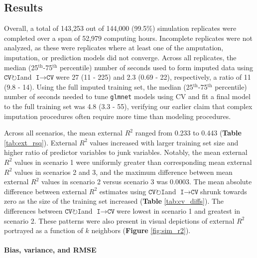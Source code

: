 \documentclass[AMA,STIX1COL,doublespace]{WileyNJD-v2}
\begin{document}
\subsection{Results} \label{subsec:sim_results}

Overall, a total of 143,253 out of 144,000 (99.5\%) simulation
replicates were completed over a span of 52,979 computing hours.
Incomplete replicates were not analyzed, as these were replicates where
at least one of the amputation, imputation, or prediction models did not
converge. Across all replicates, the median
(25\(^{\text{th}}\)-75\(^{\text{th}}\) percentile) number of seconds
used to form imputed data using
$\texttt{CV}\!\circlearrowright\!\texttt{I}$\space and
$\texttt{I}\!\!\rightarrow\!\texttt{CV}$\space were 27 (11 - 225) and
2.3 (0.69 - 22), respectively, a ratio of 11 (9.8 - 14). Using the full
imputed training set, the median (25\(^{\text{th}}\)-75\(^{\text{th}}\)
percentile) number of seconds needed to tune \texttt{glmnet} models
using CV and fit a final model to the full training set was 4.8 (3.3 -
55), verifying our earlier claim that complex imputation procedures
often require more time than modeling procedures.

Across all scenarios, the mean external \(R^2\) ranged from 0.233 to
0.443 (\textbf{Table} \ref{tab:ext_rsq}). External \(R^2\) values
increased with larger training set size and higher ratio of predictor
variables to junk variables. Notably, the mean external \(R^2\) values
in scenario 1 were uniformly greater than corresponding mean external
\(R^2\) values in scenarios 2 and 3, and the maximum difference between
mean external \(R^2\) values in scenario 2 versus scenario 3 was 0.0003.
The mean absolute difference between external \(R^2\) estimates using
$\texttt{CV}\!\circlearrowright\!\texttt{I}$\space and
$\texttt{I}\!\!\rightarrow\!\texttt{CV}$\space shrunk towards zero as
the size of the training set increased (\textbf{Table}
\ref{tab:cv_diffs}). The differences between
$\texttt{CV}\!\circlearrowright\!\texttt{I}$\space and
$\texttt{I}\!\!\rightarrow\!\texttt{CV}$\space were lowest in scenario 1
and greatest in scenario 2. These patterns were also present in visual
depictions of external \(R^2\) portrayed as a function of \(k\)
neighbors (\textbf{Figure} \ref{fig:sim_r2}).

\paragraph{Bias, variance, and RMSE}
\end{document}
